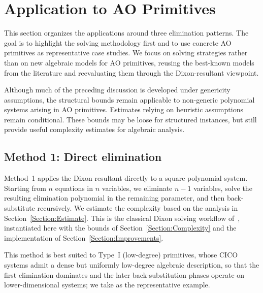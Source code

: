 \section{Application to AO Primitives}\label{Section:Application}

This section organizes the applications around three elimination patterns. The goal is to highlight the solving methodology first and to use concrete AO primitives as representative case studies. We focus on solving strategies rather than on new algebraic models for AO primitives, reusing the best-known models from the literature and reevaluating them through the Dixon-resultant viewpoint.

\begin{remark}
Although much of the preceding discussion is developed under genericity assumptions, the structural bounds remain applicable to non-generic polynomial systems arising in AO primitives. Estimates relying on heuristic assumptions remain conditional. These bounds may be loose for structured instances, but still provide useful complexity estimates for algebraic analysis.
\end{remark}

\subsection{Method 1: Direct elimination}\label{subsec:method1}
Method~1 applies the Dixon resultant directly to a square polynomial system. Starting from $n$ equations in $n$ variables, we eliminate $n-1$ variables, solve the resulting elimination polynomial in the remaining parameter, and then back-substitute recursively. We estimate the complexity based on the analysis in Section~\ref{Section:Estimate}. This is the classical Dixon solving workflow of~\cite{cryptoeprint:2005/312,Albrecht2008}, instantiated here with the bounds of Section~\ref{Section:Complexity} and the implementation of Section~\ref{Section:Improvements}.

This method is best suited to Type~I (low-degree) primitives, whose CICO systems admit a dense but uniformly low-degree algebraic description, so that the first elimination dominates and the later back-substitution phases operate on lower-dimensional systems; we take \poseidon as the representative example.


